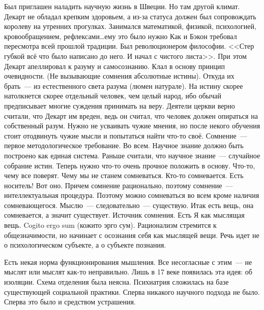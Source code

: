 Был приглашен наладить научную жизнь в Швеции. Но там другой климат. Декарт не обладал крепким здоровьем, а из-за статуса должен был сопровождать королеву на утренних прогулках. Занимался математикой, физикой, психологией, кровообращением, рефлексами\ldots ему это было нужно
Как и Бэкон требовал пересмотра всей прошлой традиции. Был революционером философии. <<Стер губкой всё что было написано до него. И начал с чистого листа>>. При этом Декарт апеллировал к разуму и самосознанию. Клал в основу принцип очевидности. (Не вызывающие сомнения абсолютные истины). Откуда их брать~--- из естественного света разума (люмен натурале). На истину скорее натолкнется скорее отдельный человек, чем целый народ, ибо обычай предписывает многие суждения принимать на веру. Деятели церкви верно считали, что Декарт им вреден, ведь он считал, что человек должен опираться на собственный разум. Нужно не усваивать чужие мнения, но после некого обучения стоит отодвинуть чужие мысли и попытаться найти что-то своё.
Сомнение~--- первое методологическое требование. Во всем.
Научное знание должно быть построено как единая система. Раньше считали, что научное знание~--- случайное собрание истин. Теперь нужно что-то очень прочное положить в основу. Что-то, чему все поверят.
Чему мы не станем сомневаться. Кто-то сомневается. Есть носитель! Вот оно. Причем сомнение рационально, поэтому сомнение~--- интеллектуальная процедура. Поэтому можно сомневаться во всем кроме наличия сомневающегося. Мыслю~--- следовательно~--- существую. Итак есть вещь, она сомневается, а значит существует. Источник сомнения. Есть Я как мыслящая вещь. Cogito ergo sum (кожито эрго сум). Рационализм стремится к общезначимости, но начинает с осознания себя как мыслящей вещи. Речь идет не о психологическом субъекте, а о субъекте познания.

Есть некая норма функционирования мышления. Все несогласные с этим~--- не мыслят или мыслят как-то неправильно. Лишь в 17 веке появилась эта идея: об изоляции. Схема отделения была неясна. Психиатрия сложилась на базе существующей социальной практики. Сперва никакого научного подхода не было. Сперва это было и средством устрашения.

